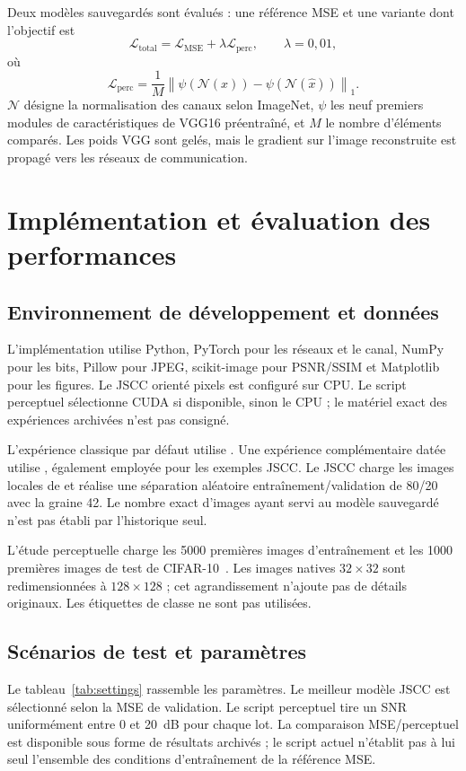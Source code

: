 \documentclass[conference]{IEEEtran}
\begin{document}
Deux modèles sauvegardés sont évalués : une référence MSE et une
variante dont l'objectif est
\begin{equation}
\mathcal L_{\mathrm{total}}=
\mathcal L_{\mathrm{MSE}}+\lambda\mathcal L_{\mathrm{perc}},
\qquad\lambda=0{,}01,
\end{equation}
où
\begin{equation}
\mathcal L_{\mathrm{perc}}=
\frac1M\left\|\psi(\mathcal N(x))-
\psi(\mathcal N(\widehat x))\right\|_1.
\end{equation}
$\mathcal N$ désigne la normalisation des canaux selon ImageNet,
$\psi$ les neuf premiers modules de caractéristiques de VGG16
préentraîné, et $M$ le nombre d'éléments comparés. Les poids VGG
sont gelés, mais le gradient sur l'image reconstruite est propagé
vers les réseaux de communication.

\section{Implémentation et évaluation des performances}
\label{sec:evaluation}
\subsection{Environnement de développement et données}
L'implémentation utilise Python, PyTorch pour les réseaux et le canal,
NumPy pour les bits, Pillow pour JPEG, scikit-image pour PSNR/SSIM et
Matplotlib pour les figures. Le JSCC orienté pixels est configuré
sur CPU. Le script perceptuel sélectionne CUDA si disponible, sinon
le CPU ; le matériel exact des expériences archivées n'est pas consigné.

L'expérience classique par défaut utilise .
Une expérience complémentaire datée utilise
, également employée pour les exemples
JSCC. Le JSCC charge les images locales de
 et réalise une séparation aléatoire
entraînement/validation de 80/20 avec la graine 42. Le nombre exact
d'images ayant servi au modèle sauvegardé n'est pas établi par
l'historique seul.

L'étude perceptuelle charge les 5000 premières images d'entraînement
et les 1000 premières images de test de CIFAR-10~\cite{cifar}. Les
images natives $32\times32$ sont redimensionnées à $128\times128$ ;
cet agrandissement n'ajoute pas de détails originaux. Les étiquettes
de classe ne sont pas utilisées.

\subsection{Scénarios de test et paramètres}
Le tableau~\ref{tab:settings} rassemble les paramètres. Le meilleur
modèle JSCC est sélectionné selon la MSE de validation. Le script
perceptuel tire un SNR uniformément entre 0 et 20~dB pour chaque lot.
La comparaison MSE/perceptuel est disponible sous forme de résultats
archivés ; le script actuel n'établit pas à lui seul l'ensemble des
conditions d'entraînement de la référence MSE.
\end{document}
